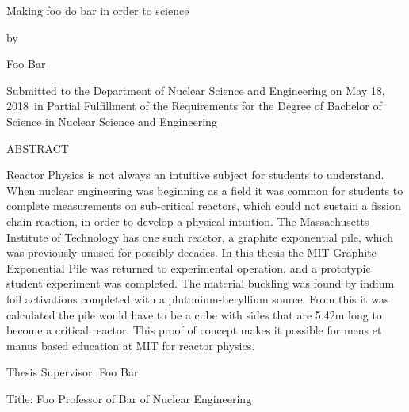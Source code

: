 \documentclass[twoside]{article}
\newcommand\blankpage{ %
    \null
    \thispagestyle{empty}
    \newpage}
\newcommand{\thesis}{Making foo do bar in order to science}
\newcommand{\me}{Foo Bar}
\newcommand{\signDate}{May 18, 2018}
\newcommand{\advisorName}{Foo Bar}
\newcommand{\advisorTitle}{Foo Professor of Bar of Nuclear Engineering}
\newcommand{\abstractart}{   
    Reactor Physics is not always an intuitive subject for students to understand. When nuclear engineering was beginning as a field it was common for students to complete measurements on sub-critical reactors, which could not sustain a fission chain reaction, in order to develop a physical intuition. The Massachusetts Institute of Technology has one such reactor, a graphite exponential pile, which was previously unused for possibly decades. In this thesis the MIT Graphite Exponential Pile was returned to experimental operation, and a prototypic student experiment was completed. The material buckling was found by indium foil activations completed with a plutonium-beryllium source. From this it was calculated the pile would have to be a cube with sides that are 5.42m long to become a critical reactor. This proof of concept makes it possible for mens et manus based education at MIT for reactor physics.
    }
\begin{document}
\newpage
\begin{titlepage}
\setcounter{page}{3} 
    \begin{center}
    {\large{\thesis}}
    
    \bigskip
    {by}
    
    \bigskip
    {\me}
    
    \bigskip
    {\parbox{3.7in}{\centering Submitted to the Department of Nuclear Science and Engineering on {\signDate}\ in Partial Fulfillment of the Requirements for the Degree of Bachelor of Science in Nuclear Science and Engineering}}
    \end{center}
    \bigskip
    
    \begin{flushleft}
    ABSTRACT
    
    \bigskip
    \abstractart
    \vfill
    {Thesis Supervisor: \advisorName}
    
    {Title: \advisorTitle}
    \end{flushleft}
    
\end{titlepage}
\blankpage
\end{document}
